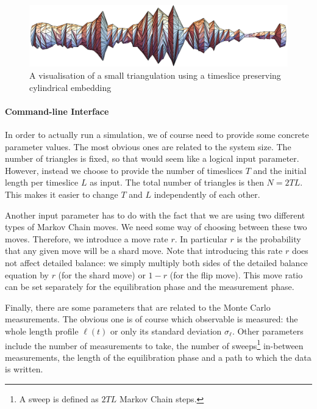 \begin{figure}[h]
    \centering
    \includegraphics[width=0.98\linewidth]{img/triangulation_visualisation.pdf}
    \caption{A visualisation of a small triangulation using a timeslice preserving cylindrical embedding}
    \label{fig:triangulation_visualisation}
\end{figure}

\paragraph{Command-line Interface}
In order to actually run a simulation, we of course need to provide some concrete parameter values. The most obvious ones are related to the system size. The number of triangles is fixed, so that would seem like a logical input parameter. However, instead we choose to provide the number of timeslices $T$ and the initial length per timeslice $L$ as input. The total number of triangles is then $N = 2 T L$. This makes it easier to change $T$ and $L$ independently of each other.

Another input parameter has to do with the fact that we are using two different types of Markov Chain moves. We need some way of choosing between these two moves. Therefore, we introduce a move rate $r$. In particular $r$ is the probability that any given move will be a shard move. Note that introducing this rate $r$ does not affect detailed balance: we simply multiply both sides of the detailed balance equation by $r$ (for the shard move) or $1 - r$ (for the flip move). This move ratio can be set separately for the equilibration phase and the measurement phase.

Finally, there are some parameters that are related to the Monte Carlo measurements. The obvious one is of course which observable is measured: the whole length profile $\ell(t)$ or only its standard deviation $\sigma_\ell$. Other parameters include the number of measurements to take, the number of sweeps\footnote{A sweep is defined as $2 T L$ Markov Chain steps.} in-between measurements, the length of the equilibration phase and a path to which the data is written.




